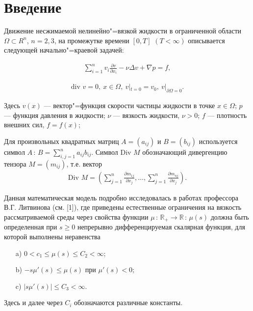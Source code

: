 \documentclass[14pt, a4paper]{extarticle}
\numberwithin{equation}{section}
\begin{document}
    \section{Введение}

    Движение несжимаемой нелинейно"=вязкой жидкости в ограниченной области $\Omega \subset R^n$,
    $n = 2, 3$, на промежутке времени $[0, T]$ $(T < \infty)$ описывается следующей начально"=краевой задачей:

    \begin{equation}\label{eq:1.1}
        \begin{gathered}
            \sum\limits_{i = 1}^n v_i \frac{\partial v}{\partial x_i} - \nu \Delta v + \nabla p = f,
        \end{gathered}
    \end{equation}

    \begin{equation}\label{eq:1.2}
        \begin{gathered}
            \textrm{div } v = 0, \ x \in \Omega, \ v|_{t=0} = v_0, \ v|_{\partial\Omega = 0}.
        \end{gathered}
    \end{equation}

    Здесь $v(x)$ --- вектор"=функция скорости частицы жидкости в точке $x \in \Omega$;
    $p$ --- функция давления в жидкости; $\nu$ --- вязкость жидкости, $\nu > 0$;
    $f$ --- плотность внешних сил, $f = f(x)$; 

    Для произвольных квадратных матриц $A = (a_{ij})$ и $B = (b_{ij})$ используется символ
    $A\, : \,B = \sum_{i,j = 1}^n a_{ij} b_{ij}$. Символ Div $M$ обозначающий дивергенцию тензора
    $M = (m_{ij})$, т.е. вектор
    \begin{equation*}
        \begin{gathered}
            \textrm{Div } M = (\sum\limits_{j = 1}^n \frac{\partial m_{1j}}{\partial x_j}, \ldots, \sum\limits_{j = 1}^n \frac{\partial m_{nj}}{\partial x_j}).
        \end{gathered}
    \end{equation*}

    Данная математическая модель подробно исследовалась в работах профессора В.Г. Литвинова
    (см. [1]), где приведены естественные ограничения на вязкость рассматриваемой среды через
    свойства функции $\mu\, : \,\mathbb{R}_+ \rightarrow \mathbb{R}\, : \,\mu(s)$ должна быть определенная
    при $s \geq 0$ непрерывно дифференцируемая скалярная функция, для которой выполнены неравенства
    \begin{itemize}
        \item [a)] $0 < c_1 \leq \mu(s) \leq C_2 < \infty$;
        \item [b)] $-s\mu'(s) \leq \mu(s)$ при $\mu'(s) < 0$;
        \item [c)] $|s\mu'(s)| \leq C_3 < \infty$.
    \end{itemize}
    Здесь и далее через $C_i$ обозначаются различные константы.
\end{document}
